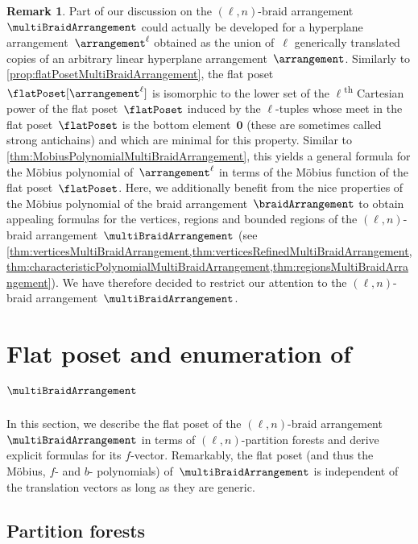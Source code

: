 \documentclass{amsart}
\theoremstyle{definition}
\newtheorem{remark}[theorem]{Remark}
\renewcommand{\b}[1]{{\boldsymbol{#1}}} %
\newcommand{\ordinal}{\textsuperscript{th}} %
\renewcommand{\b}[1]{\boldsymbol{#1}} %
\begin{document}
\begin{remark}
Part of our discussion on the $(\ell,n)$-braid arrangement~$\multiBraidArrangement$ could actually be developed for a hyperplane arrangement~$\arrangement^\ell$ obtained as the union of~$\ell$ generically translated copies of an arbitrary linear hyperplane arrangement~$\arrangement$.
Similarly to \cref{prop:flatPosetMultiBraidArrangement}, the flat poset~$\flatPoset[\arrangement^\ell]$ is isomorphic to the lower set of the $\ell$\ordinal{} Cartesian power of the flat poset~$\flatPoset$ induced by the $\ell$-tuples whose meet in the flat poset~$\flatPoset$ is the bottom element~$\b{0}$ (these are sometimes called strong antichains) and which are minimal for this property.
Similar to \cref{thm:MobiusPolynomialMultiBraidArrangement}, this yields a general formula for the M\"obius polynomial of~$\arrangement^\ell$ in terms of the M\"obius function of the flat poset~$\flatPoset$.
Here, we additionally benefit from the nice properties of the M\"obius polynomial of the braid arrangement~$\braidArrangement$ to obtain appealing formulas for the vertices, regions and bounded regions of the $(\ell,n)$-braid arrangement~$\multiBraidArrangement$ (see \cref{thm:verticesMultiBraidArrangement,thm:verticesRefinedMultiBraidArrangement,thm:characteristicPolynomialMultiBraidArrangement,thm:regionsMultiBraidArrangement}).
We have therefore decided to restrict our attention to the $(\ell,n)$-braid arrangement~$\multiBraidArrangement$.
\end{remark}


\section{Flat poset and enumeration of~$\multiBraidArrangement$}
\label{sec:flatPoset}

In this section, we describe the flat poset of the $(\ell,n)$-braid arrangement~$\multiBraidArrangement$ in terms of \mbox{$(\ell,n)$-partition} forests and derive explicit formulas for its $f$-vector.
Remarkably, the flat poset (and thus the M\"obius, $f$- and $b$- polynomials) of~$\multiBraidArrangement$ is independent of the translation vectors as long as they are generic.


\subsection{Partition forests}
\label{subsec:partitionForests}
\end{document}
